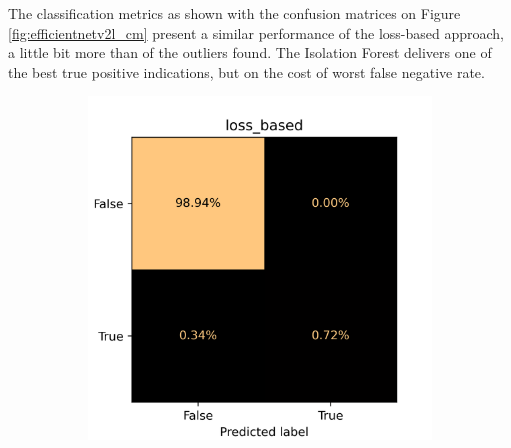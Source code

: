 The classification metrics as shown with the confusion matrices on Figure \ref{fig:efficientnetv2l_cm}
present a similar performance of the loss-based approach,
a little bit more than \small {} of the outliers found.
The Isolation Forest delivers one of the best true positive indications,
but on the cost of worst false negative rate.

\begin{figure}[!ht]
    \centering
    \begin{subfigure}{0.4\textwidth}
        \centering
        \includegraphics[width=\textwidth]{./results/efficientnetv2l_vgg19/20230525_194238_loss_based_cm.png}
    \end{subfigure}
    \begin{subfigure}{0.4\textwidth}
        \centering

\end{subfigure}
\end{figure}
